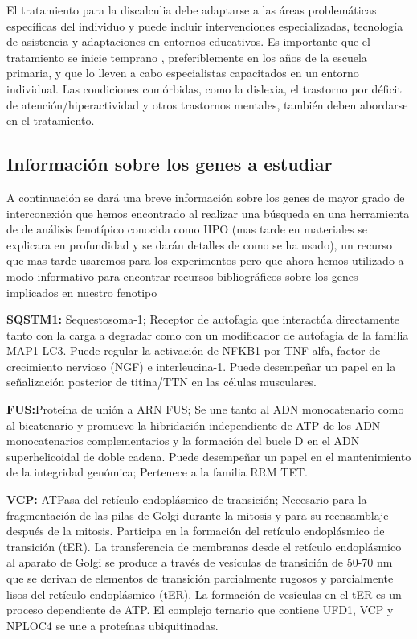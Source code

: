 \hfill

El tratamiento para la discalculia debe adaptarse a las áreas problemáticas específicas del individuo y puede incluir intervenciones  especializadas, tecnología de asistencia y adaptaciones en entornos educativos. Es importante que el tratamiento se inicie temprano \cite{ManagementDis}, preferiblemente en los años de la escuela primaria, y que lo lleven a cabo especialistas capacitados en un entorno individual. Las condiciones comórbidas, como la dislexia, el trastorno por déficit de atención/hiperactividad y otros trastornos mentales, también deben abordarse en el tratamiento.

\hfill



\hfill

\subsection{Información sobre los genes a estudiar}


A continuación se dará una breve información sobre los genes de mayor grado de interconexión que hemos encontrado al realizar una búsqueda en una herramienta de de análisis fenotípico conocida como HPO \cite{HPO_paper} (mas tarde en materiales se explicara en profundidad y se darán detalles de como se ha usado), un recurso que mas tarde usaremos para los experimentos pero que ahora hemos utilizado a modo informativo para encontrar recursos bibliográficos sobre los genes implicados en nuestro fenotipo

\hfill

\textbf{SQSTM1\cite{SQSTM1}:} Sequestosoma-1; Receptor de autofagia que interactúa directamente tanto con la carga a degradar como con un modificador de autofagia de la familia MAP1 LC3. Puede regular la activación de NFKB1 por TNF-alfa, factor de crecimiento nervioso (NGF) e interleucina-1. Puede desempeñar un papel en la señalización posterior de titina/TTN en las células musculares.

\hfill

\textbf{FUS\cite{FUS}:}Proteína de unión a ARN FUS; Se une tanto al ADN monocatenario como al bicatenario y promueve la hibridación independiente de ATP de los ADN monocatenarios complementarios y la formación del bucle D en el ADN superhelicoidal de doble cadena. Puede desempeñar un papel en el mantenimiento de la integridad genómica; Pertenece a la familia RRM TET.

\hfill

\textbf{VCP\cite{VCP}:} ATPasa del retículo endoplásmico de transición; Necesario para la fragmentación de las pilas de Golgi durante la mitosis y para su reensamblaje después de la mitosis. Participa en la formación del retículo endoplásmico de transición (tER). La transferencia de membranas desde el retículo endoplásmico al aparato de Golgi se produce a través de vesículas de transición de 50-70 nm que se derivan de elementos de transición parcialmente rugosos y parcialmente lisos del retículo endoplásmico (tER). La formación de vesículas en el tER es un proceso dependiente de ATP. El complejo ternario que contiene UFD1, VCP y NPLOC4 se une a proteínas ubiquitinadas.

